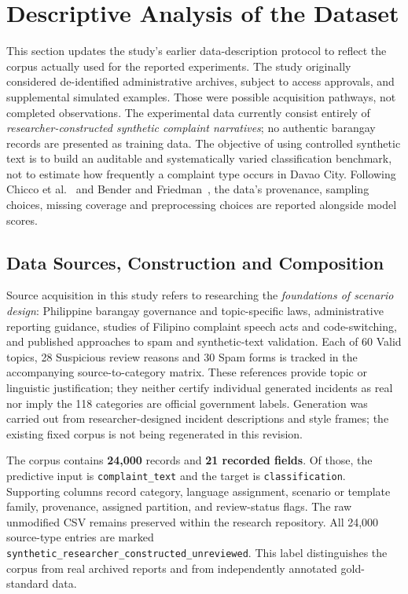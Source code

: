 \section{Descriptive Analysis of the Dataset}
\label{sec:data-description}
This section updates the study's earlier data-description protocol to reflect the corpus actually used for the reported experiments. The study originally considered de-identified administrative archives, subject to access approvals, and supplemental simulated examples. Those were possible acquisition pathways, not completed observations. The experimental data currently consist entirely of \emph{researcher-constructed synthetic complaint narratives}; no authentic barangay records are presented as training data. The objective of using controlled synthetic text is to build an auditable and systematically varied classification benchmark, not to estimate how frequently a complaint type occurs in Davao City. Following Chicco et al.~\cite{chicco2022} and Bender and Friedman~\cite{benderfriedman}, the data's provenance, sampling choices, missing coverage and preprocessing choices are reported alongside model scores.

\subsection{Data Sources, Construction and Composition}
Source acquisition in this study refers to researching the \emph{foundations of scenario design}: Philippine barangay governance and topic-specific laws, administrative reporting guidance, studies of Filipino complaint speech acts and code-switching, and published approaches to spam and synthetic-text validation. Each of 60 Valid topics, 28 Suspicious review reasons and 30 Spam forms is tracked in the accompanying source-to-category matrix. These references provide topic or linguistic justification; they neither certify individual generated incidents as real nor imply the 118 categories are official government labels. Generation was carried out from researcher-designed incident descriptions and style frames; the existing fixed corpus is not being regenerated in this revision.

The corpus contains \textbf{24,000} records and \textbf{21 recorded fields}. Of those, the predictive input is \texttt{complaint\_text} and the target is \texttt{classification}. Supporting columns record category, language assignment, scenario or template family, provenance, assigned partition, and review-status flags. The raw unmodified CSV remains preserved within the research repository. All 24,000 source-type entries are marked \texttt{synthetic\_researcher\_constructed\_unreviewed}. This label distinguishes the corpus from real archived reports and from independently annotated gold-standard data.

